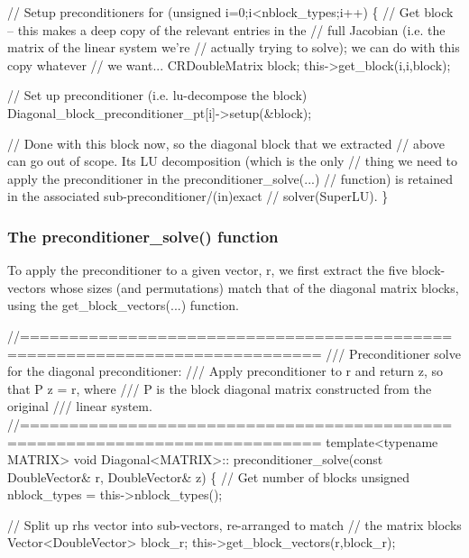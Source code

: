 \begin{DoxyCodeInclude}
  \textcolor{comment}{// Setup preconditioners}
  \textcolor{keywordflow}{for} (\textcolor{keywordtype}{unsigned} i=0;i<nblock\_types;i++)
   \{
    \textcolor{comment}{// Get block -- this makes a deep copy of the relevant entries in the}
    \textcolor{comment}{// full Jacobian (i.e. the matrix of the linear system we're}
    \textcolor{comment}{// actually trying to solve); we can do with this copy whatever}
    \textcolor{comment}{// we want...}
    CRDoubleMatrix block;
    this->get\_block(i,i,block);
    
    \textcolor{comment}{// Set up preconditioner (i.e. lu-decompose the block)}
    Diagonal\_block\_preconditioner\_pt[i]->setup(&block);
    
    \textcolor{comment}{// Done with this block now, so the diagonal block that we extracted}
    \textcolor{comment}{// above can go out of scope. Its LU decomposition (which is the only }
    \textcolor{comment}{// thing we need to apply the preconditioner in the preconditioner\_solve(...)}
    \textcolor{comment}{// function) is retained in the associated sub-preconditioner/(in)exact }
    \textcolor{comment}{// solver(SuperLU).}
   \}

\end{DoxyCodeInclude}
\hypertarget{index_diag_solve}{}\subsubsection{The preconditioner\+\_\+solve() function}\label{index_diag_solve}
To apply the preconditioner to a given vector, r, we first extract the five block-\/vectors whose sizes (and permutations) match that of the diagonal matrix blocks, using the {\ttfamily get\+\_\+block\+\_\+vectors}(...) function.


\begin{DoxyCodeInclude}
 \textcolor{comment}{//============================================================================}\textcolor{comment}{}
\textcolor{comment}{ /// Preconditioner solve for the diagonal preconditioner: }
\textcolor{comment}{ /// Apply preconditioner to r and return z, so that P z = r, where}
\textcolor{comment}{ /// P is the block diagonal matrix constructed from the original }
\textcolor{comment}{ /// linear system.}
\textcolor{comment}{} \textcolor{comment}{//============================================================================}
 \textcolor{keyword}{template}<\textcolor{keyword}{typename} MATRIX> 
 \textcolor{keywordtype}{void} Diagonal<MATRIX>::
 preconditioner\_solve(\textcolor{keyword}{const} DoubleVector& r, DoubleVector& z)
 \{   
  \textcolor{comment}{// Get number of blocks}
  \textcolor{keywordtype}{unsigned} nblock\_types = this->nblock\_types();

  \textcolor{comment}{// Split up rhs vector into sub-vectors, re-arranged to match}
  \textcolor{comment}{// the matrix blocks}
  Vector<DoubleVector> block\_r;
  this->get\_block\_vectors(r,block\_r);

\end{DoxyCodeInclude}



